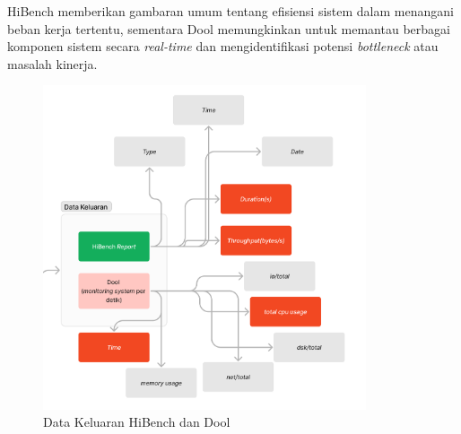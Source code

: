 HiBench memberikan gambaran umum tentang efisiensi sistem dalam menangani beban kerja tertentu, sementara Dool memungkinkan untuk memantau berbagai komponen sistem secara\textit{ real-time} dan mengidentifikasi potensi \textit{bottleneck} atau masalah kinerja.

\begin{figure}[h]
    \centering
    \includegraphics[width=0.85\textwidth]{figures/ch02/output-hibench-dool.png}
    \caption{Data Keluaran HiBench dan Dool}
    \label{fig:output-hibench-dool}
\end{figure}
